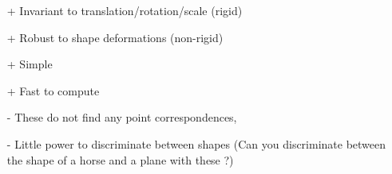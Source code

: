 \documentclass{article}
\begin{document}
{    

    \begin{itemize}[noitemsep]
        \item[+] Invariant to translation/rotation/scale (rigid)
        \item[+] Robust to shape deformations (non-rigid)
        \item[+] Simple 
        \item[+] Fast to compute  
        \item[-] These do not find any point correspondences, 
        \item[-] Little power to discriminate between shapes (Can you discriminate between the shape of a horse and a plane with these ?) 
    \end{itemize}
}
\end{document}

